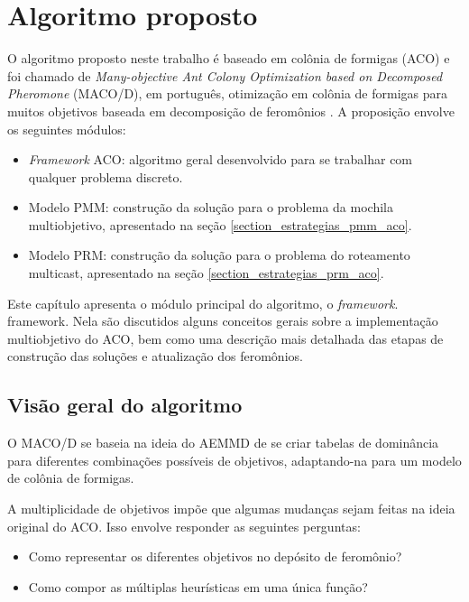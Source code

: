 \chapter[Algoritmo proposto]{Algoritmo proposto}
\label{chapter_macod}

O algoritmo proposto neste trabalho é baseado em colônia de formigas (ACO) e foi chamado de \textit{Many-objective Ant Colony Optimization based on Decomposed Pheromone} (MACO/D), em português, otimização em colônia de formigas para muitos objetivos baseada em decomposição de feromônios \cite{Franca2018}. A proposição envolve os seguintes módulos:

\begin{itemize}
	\item \textit{Framework} ACO: algoritmo geral desenvolvido para se trabalhar com qualquer problema discreto.
	\item Modelo PMM: construção da solução para o problema da mochila multiobjetivo, apresentado na seção \ref{section_estrategias_pmm_aco}.
	\item Modelo PRM: construção da solução para o problema do roteamento multicast, apresentado na seção \ref{section_estrategias_prm_aco}.
\end{itemize}

Este capítulo apresenta o módulo principal do algoritmo, o \textit{framework}. framework. Nela são discutidos alguns conceitos gerais sobre a implementação multiobjetivo do ACO, bem como uma descrição mais detalhada das etapas de construção das soluções e atualização dos feromônios.

\section{Visão geral do algoritmo}

O MACO/D se baseia na ideia do AEMMD de se criar tabelas de dominância para diferentes combinações possíveis de objetivos, adaptando-na para um modelo de colônia de formigas.

A multiplicidade de objetivos impõe que algumas mudanças sejam feitas na ideia original do ACO. Isso envolve responder as seguintes perguntas:

\begin{itemize}
	\item Como representar os diferentes objetivos no depósito de feromônio?
	\item Como compor as múltiplas heurísticas em uma única função?
\end{itemize}

